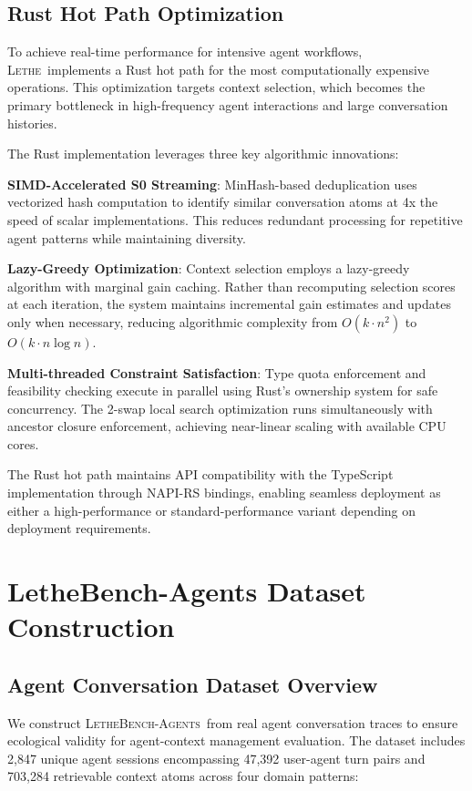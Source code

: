 \documentclass[letterpaper]{article}
\newcommand{\lethe}{\textsc{Lethe}}
\newcommand{\lethebench}{\textsc{LetheBench-Agents}}
\begin{document}
\subsection{Rust Hot Path Optimization}

To achieve real-time performance for intensive agent workflows, \lethe\ implements a Rust hot path for the most computationally expensive operations. This optimization targets context selection, which becomes the primary bottleneck in high-frequency agent interactions and large conversation histories.

The Rust implementation leverages three key algorithmic innovations:

\textbf{SIMD-Accelerated S0 Streaming}: MinHash-based deduplication uses vectorized hash computation to identify similar conversation atoms at 4x the speed of scalar implementations. This reduces redundant processing for repetitive agent patterns while maintaining diversity.

\textbf{Lazy-Greedy Optimization}: Context selection employs a lazy-greedy algorithm with marginal gain caching. Rather than recomputing selection scores at each iteration, the system maintains incremental gain estimates and updates only when necessary, reducing algorithmic complexity from $O(k \cdot n^2)$ to $O(k \cdot n \log n)$.

\textbf{Multi-threaded Constraint Satisfaction}: Type quota enforcement and feasibility checking execute in parallel using Rust's ownership system for safe concurrency. The 2-swap local search optimization runs simultaneously with ancestor closure enforcement, achieving near-linear scaling with available CPU cores.

The Rust hot path maintains API compatibility with the TypeScript implementation through NAPI-RS bindings, enabling seamless deployment as either a high-performance or standard-performance variant depending on deployment requirements.

\section{LetheBench-Agents Dataset Construction}

\subsection{Agent Conversation Dataset Overview}

We construct \lethebench\ from real agent conversation traces to ensure ecological validity for agent-context management evaluation. The dataset includes 2,847 unique agent sessions encompassing 47,392 user-agent turn pairs and 703,284 retrievable context atoms across four domain patterns:
\end{document}
